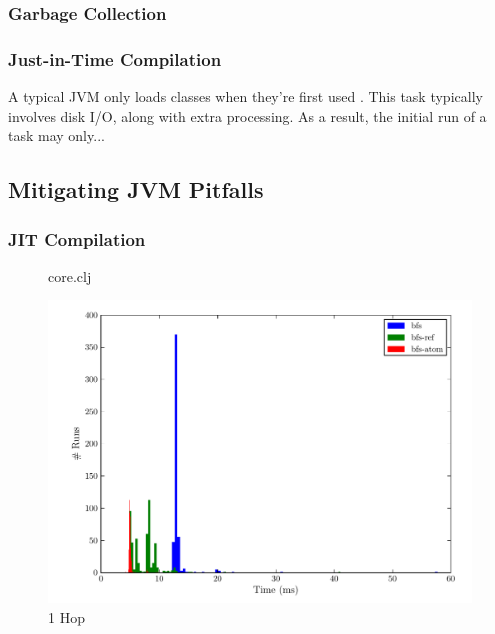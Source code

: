 \documentclass[12pt,letterpaper,oneside,notitlepage]{report}
\theoremstyle{definition}
\begin{document}
				\subsubsection{Garbage Collection}
			
				\subsubsection{Just-in-Time Compilation}
					A typical JVM only loads classes when they're first used \cite{rob-java-bench-08}.  This task typically involves disk I/O, along with extra processing.  As a result, the initial run of a task may only...
			
			\subsection{Mitigating JVM Pitfalls}
				\subsubsection{JIT Compilation}
					\begin{figure}[ht!]
			
						\caption{core.clj}
					\end{figure}
		
		\begin{figure}[!ht]
			\centering
			\includegraphics[scale=0.85]{1_hops}
			\caption{1 Hop}
			\label{fig:perf-1-hop}
		\end{figure}
		
\end{document}
